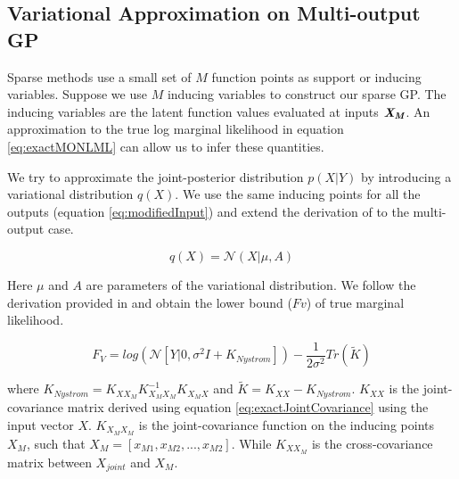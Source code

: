 \subsection{Variational Approximation on Multi-output GP}\label{sec:varMOGP}
Sparse methods use a small set of \(M\) function points as support or inducing variables. Suppose we use \(M\) inducing variables to construct our sparse GP. The inducing variables are the latent function values evaluated at inputs \(\bm{\mathit{X_{M}}}\). An approximation to the true log marginal likelihood in equation \ref{eq:exactMONLML} can allow us to infer these quantities.

We try to approximate the joint-posterior distribution \(p(X| Y)\) by introducing a variational distribution \(q(X)\). We use the same inducing points for all the outputs (equation \ref{eq:modifiedInput}) and extend the derivation of \cite{Titsias09variationallearning} to the multi-output case. 

\begin{equation}\label{eq:multiVariationalQ}
 q(X) = \mathcal{N}(X|  \mu, A)
\end{equation}
 
Here \(\mu\) and \(A\) are parameters of the variational distribution. We follow the derivation provided in \cite{Titsias09variationallearning} and obtain the lower bound ($Fv$) of true marginal likelihood.

\begin{equation}\label{eq:lowerBoundMultiVarNLML}
F_{V} = log(\mathcal{N}[Y| 0, \sigma ^{2}I + K_{Nystrom}]) - \frac{1}{2\sigma ^{2}}Tr(\tilde{K})
\end{equation}

where \(K_{Nystrom} = K_{XX_{M}}K_{X_{M}X_{M}}^{-1}K_{X_{M}X}\) and \(\tilde{K} = K_{XX} - K_{Nystrom}\). \(K_{XX}\) is the joint-covariance matrix derived using equation \ref{eq:exactJointCovariance} using the input vector \(X\). \(K_{X_{M}X_{M}}\) is the joint-covariance function on the inducing points \(X_{M}\), such that \(X_{M} = [x_{M1}, x_{M2}, ..., x_{M2}]\). While \(K_{XX_{M}}\) is the cross-covariance matrix between \(X_{joint}\) and \(X_{M}\). 

